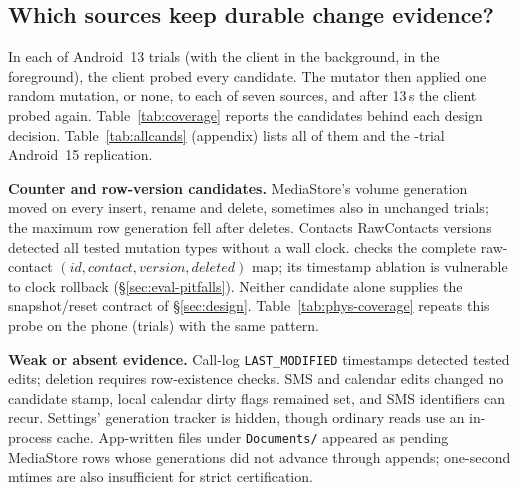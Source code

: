 \subsection{Which sources keep durable change evidence?}
\label{sec:meas-coverage}



In each of \EOneTrials Android~13 trials (\EOneBgTrials with the client in the background, \EOneFgTrials in the foreground), the client probed every candidate. The mutator then applied one random mutation, or none, to each of seven sources, and after 13\,s the client probed again. Table~\ref{tab:coverage} reports the candidates behind each design decision. Table~\ref{tab:allcands} (appendix) lists all of them and the \EOneApiTrials-trial Android~15 replication.

\textbf{Counter and row-version candidates.} MediaStore's volume generation~\cite{android_mediastore} moved on every insert, rename and delete, sometimes also in unchanged trials; the maximum row generation fell after deletes. Contacts RawContacts versions detected all tested mutation types without a wall clock. \stamp checks the complete raw-contact $(id,contact,version,deleted)$ map; its timestamp ablation is vulnerable to clock rollback (\S\ref{sec:eval-pitfalls}). Neither candidate alone supplies the snapshot/reset contract of \S\ref{sec:design}. Table~\ref{tab:phys-coverage} repeats this probe on the phone (\PhysCoverageTrials trials) with the same pattern.

\textbf{Weak or absent evidence.} Call-log \texttt{LAST\_MODIFIED} timestamps detected tested edits; deletion requires row-existence checks. SMS and calendar edits changed no candidate stamp, local calendar dirty flags remained set, and SMS identifiers can recur. Settings' generation tracker is hidden, though ordinary reads use an in-process cache. App-written files under \texttt{Documents/} appeared as pending MediaStore rows whose generations did not advance through appends; one-second mtimes are also insufficient for strict certification.

